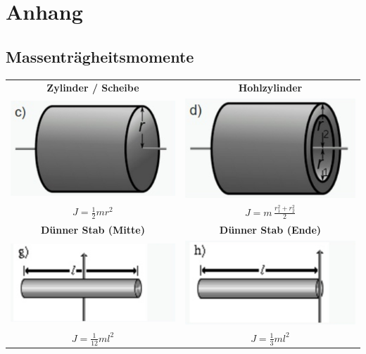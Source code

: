 \section{Anhang}


\subsection{Massenträgheitsmomente} %
\label{Massenträgheitsmomente}

\begin{center}
\begin{tabular}{| c | c |}
\hline
\textbf{Zylinder / Scheibe} & \textbf{Hohlzylinder} \\
\includegraphics[width=0.35\linewidth]{Bilder/Wellen-Optik/J_zylinder} & \includegraphics[width=0.35\linewidth]{Bilder/Wellen-Optik/J_hohlzylinder} \\
$J = \frac{1}{2} m r^2$ & $J = m \, \frac{r_1^2 + r_2^2}{2}$ \\
\hline
\textbf{Dünner Stab (Mitte)} & \textbf{Dünner Stab (Ende)} \\
\includegraphics[width=0.35\linewidth]{Bilder/Wellen-Optik/J_duenner_stab_mitte} & \includegraphics[width=0.35\linewidth]{Bilder/Wellen-Optik/J_duenner_stab_ende} \\
$J = \frac{1}{12} m l^2$ & $J = \frac{1}{3} m l^2$ \\

\end{tabular}
\end{center}
